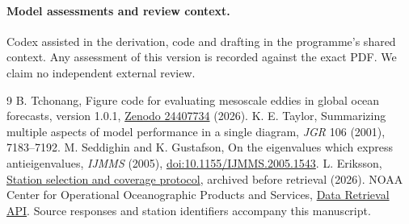 \documentclass[11pt]{article}
\begin{document}
\paragraph{Model assessments and review context.} Codex assisted in the derivation, code and drafting in the programme's shared context. Any assessment of this version is recorded against the exact PDF. We claim no independent external review.

\begin{thebibliography}{9}
 B. Tchonang, Figure code for evaluating mesoscale eddies in global ocean forecasts, version 1.0.1, \href{https://doi.org/10.5281/zenodo.24407734}{Zenodo 24407734} (2026).
 K. E. Taylor, Summarizing multiple aspects of model performance in a single diagram, \emph{JGR} 106 (2001), 7183--7192.
 M. Seddighin and K. Gustafson, On the eigenvalues which express antieigenvalues, \emph{IJMMS} (2005), \href{https://doi.org/10.1155/IJMMS.2005.1543}{doi:10.1155/IJMMS.2005.1543}.
 L. Eriksson, \href{https://github.com/lluiseriksson/THE-ERIKSSON-PROGRAMME/blob/3ad9fe5d3f61810f4bad3412d031c047c1845e72/audits/tide-coverage-sensitivity/ocean-protocol.md}{Station selection and coverage protocol}, archived before retrieval (2026).
 NOAA Center for Operational Oceanographic Products and Services, \href{https://api.tidesandcurrents.noaa.gov/api/prod/}{Data Retrieval API}. Source responses and station identifiers accompany this manuscript.
\end{thebibliography}
\end{document}
